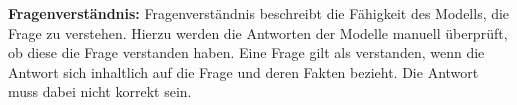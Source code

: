 \noindent\textbf{Fragenverständnis:}\newline
Fragenverständnis beschreibt die Fähigkeit des Modells, die Frage zu verstehen.
Hierzu werden die Antworten der Modelle manuell überprüft, ob diese die Frage verstanden haben. Eine Frage gilt als verstanden, wenn die Antwort sich inhaltlich auf die Frage und deren Fakten bezieht. Die Antwort muss dabei nicht korrekt sein.\\
